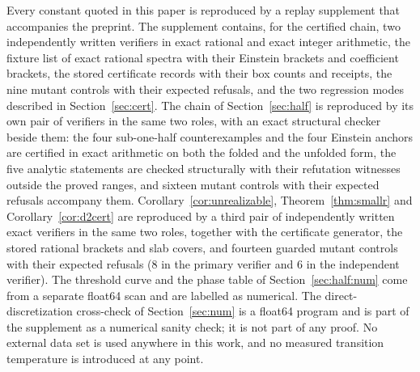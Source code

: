 \documentclass[11pt]{article}
\theoremstyle{definition}
\theoremstyle{remark}
\begin{document}
Every constant quoted in this paper is reproduced by a replay supplement that accompanies
the preprint. The supplement contains, for the certified chain, two independently written
verifiers in exact rational and exact integer arithmetic, the fixture list of exact
rational spectra with their Einstein brackets and coefficient brackets, the stored
certificate records with their box counts and receipts, the nine mutant controls with
their expected refusals, and the two regression modes described in
Section~\ref{sec:cert}. The chain of Section~\ref{sec:half} is reproduced by its own pair
of verifiers in the same two roles, with an exact structural checker beside them: the four
sub-one-half counterexamples and the
four Einstein anchors are certified in exact arithmetic on both the folded and the unfolded
form, the five analytic statements are checked structurally with their refutation witnesses
outside the proved ranges, and sixteen mutant controls with their expected refusals
accompany them. Corollary~\ref{cor:unrealizable}, Theorem~\ref{thm:smallr} and
Corollary~\ref{cor:d2cert} are reproduced by a third pair of independently written exact
verifiers in the same two roles, together with the certificate generator, the stored
rational brackets and slab covers, and fourteen guarded mutant controls with their expected
refusals ($8$ in the primary verifier and $6$ in the independent verifier). The threshold
curve and the phase table of Section~\ref{sec:half:num} come
from a separate float64 scan and are labelled as numerical. The
direct-discretization cross-check of Section~\ref{sec:num} is a float64 program and is part
of the supplement as a numerical sanity check; it is not part of any proof. No external
data set is used anywhere in this work, and no measured transition temperature is
introduced at any point.



\end{document}
